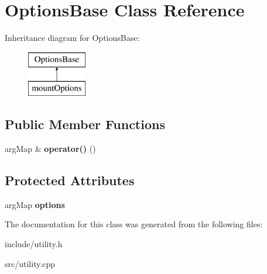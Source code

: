 \hypertarget{classOptionsBase}{\section{\-Options\-Base \-Class \-Reference}
\label{d0/d13/classOptionsBase}
}
\-Inheritance diagram for \-Options\-Base\-:\begin{figure}[H]
\begin{center}
\leavevmode
\includegraphics[height=2.000000cm]{d0/d13/classOptionsBase}
\end{center}
\end{figure}
\subsection*{\-Public \-Member \-Functions}
\begin{DoxyCompactItemize}
\item 
\hypertarget{classOptionsBase_af36ccbd9db3c53e1ec4b8163eca1bccb}{arg\-Map \& {\bfseries operator()} ()}\label{d0/d13/classOptionsBase_af36ccbd9db3c53e1ec4b8163eca1bccb}

\end{DoxyCompactItemize}
\subsection*{\-Protected \-Attributes}
\begin{DoxyCompactItemize}
\item 
\hypertarget{classOptionsBase_a230ad2f42262ae364bf1c2ef2bb70994}{arg\-Map {\bfseries options}}\label{d0/d13/classOptionsBase_a230ad2f42262ae364bf1c2ef2bb70994}

\end{DoxyCompactItemize}


\-The documentation for this class was generated from the following files\-:\begin{DoxyCompactItemize}
\item 
include/utility.\-h\item 
src/utility.\-cpp\end{DoxyCompactItemize}
